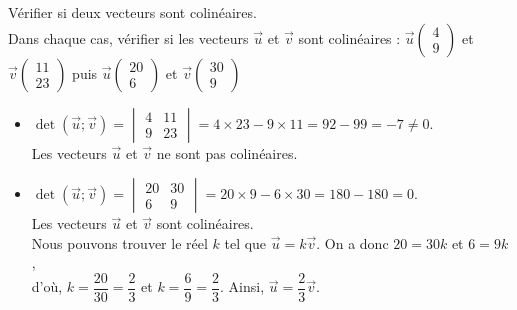 \begin{Méthode}Vérifier si deux vecteurs sont colinéaires. \\
Dans chaque cas, vérifier si les vecteurs $\overrightarrow{u}$ et $\overrightarrow{v}$ sont colinéaires : $\overrightarrow{u}\begin{pmatrix} 
4 \\
9
 \end{pmatrix}$ et $\overrightarrow{v}\begin{pmatrix} 
11 \\
23
 \end{pmatrix}$ puis $\overrightarrow{u}\begin{pmatrix} 
20 \\
6
 \end{pmatrix}$ et $\overrightarrow{v}\begin{pmatrix} 
30 \\
9
 \end{pmatrix}$\\
\begin{itemize}[label=\textcolor{Couleur3}{$\bullet$}]
 \item $\det(\overrightarrow{u};\overrightarrow{v})=\begin{vmatrix}
4 & 11 \\
9 & 23
 \end{vmatrix}=4\times 23 -9\times 11=92-99=-7\neq 0$. \\
 Les vecteurs $\overrightarrow{u}$ et $\overrightarrow{v}$ ne sont pas colinéaires. 
\item $\det(\overrightarrow{u};\overrightarrow{v})=\begin{vmatrix}
20 & 30 \\
6 & 9
 \end{vmatrix}=20\times 9 -6\times 30=180-180=0$.\\
Les vecteurs $\overrightarrow{u}$ et $\overrightarrow{v}$ sont colinéaires.\\ 
Nous pouvons trouver le réel $k$ tel que $\overrightarrow{u}=k\overrightarrow{v}$. On a donc $20=30k$ et $6=9k$, \\d'où, $k=\dfrac{20}{30}=\dfrac{2}{3}$ et $k=\dfrac{6}{9}=\dfrac{2}{3}$. Ainsi, $\overrightarrow{u}=\dfrac{2}{3}\overrightarrow{v}$.
\end{itemize}
 



\end{Méthode}

\newpage

